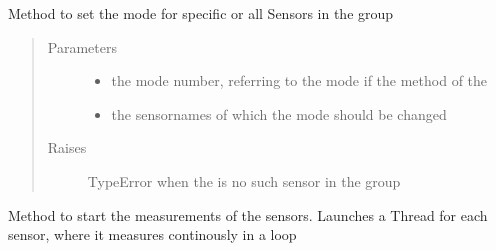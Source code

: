 \documentclass[letterpaper,10pt,english]{sphinxmanual}
\begin{document}
\begin{fulllineitems}
\begin{fulllineitems}
\label{\detokenize{sensor:lib.sensor.SensorGroup.set_mode}}
Method to set the mode for specific or all Sensors in the group
\begin{quote}\begin{description}
\item[{Parameters}] \leavevmode\begin{itemize}
\item {} 
 \textendash{} the mode number, referring to the mode if the {\hyperref[\detokenize{sensor:lib.sensor.Sensor.configure}]{}} method of the {\hyperref[\detokenize{sensor:lib.sensor.Sensor}]{}}

\item {} 
 \textendash{} the sensornames of which the mode should be changed

\end{itemize}

\item[{Raises}] \leavevmode
{} \textendash{} TypeError when the is no such sensor in the group

\end{description}\end{quote}

\end{fulllineitems}


\begin{fulllineitems}
\label{\detokenize{sensor:lib.sensor.SensorGroup.start}}
Method to start the measurements of the sensors. Launches a Thread for each sensor, where it measures continously
in a loop

\end{fulllineitems}


\end{fulllineitems}
\end{document}
